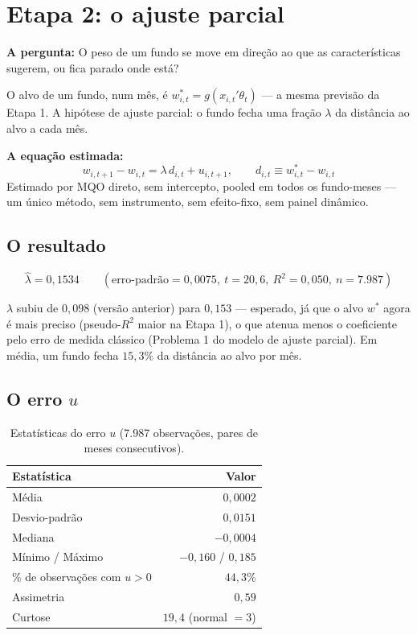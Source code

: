 \documentclass[11pt,a4paper]{article}
\newcommand{\pergunta}[1]{\par\vspace{4pt}\noindent\textbf{\color{azul}A pergunta:} #1\par\vspace{2pt}}
\newcommand{\equacao}[0]{\par\vspace{4pt}\noindent\textbf{\color{vermelho}A equação estimada:}\ }
\begin{document}
\FloatBarrier
\section{Etapa 2: o ajuste parcial}

\pergunta{O peso de um fundo se move em direção ao que as características sugerem, ou fica
parado onde está?}

O alvo de um fundo, num mês, é $w^*_{i,t}=g(x_{i,t}'\theta_t)$ --- a mesma previsão da Etapa 1.
A hipótese de ajuste parcial: o fundo fecha uma fração $\lambda$ da distância ao alvo a cada mês.

\equacao
\begin{equation}
w_{i,t+1} - w_{i,t} = \lambda\, d_{i,t} + u_{i,t+1}, \qquad d_{i,t} \equiv w^*_{i,t} - w_{i,t}
\label{eq:pa}
\end{equation}
Estimado por MQO direto, sem intercepto, pooled em todos os fundo-meses --- um único método,
sem instrumento, sem efeito-fixo, sem painel dinâmico.

\subsection{O resultado}

$$\widehat\lambda = 0{,}1534 \qquad (\text{erro-padrão}=0{,}0075,\ t=20{,}6,\
R^2=0{,}050,\ n=7.987)$$

$\lambda$ subiu de $0{,}098$ (versão anterior) para $0{,}153$ --- esperado, já que o alvo $w^*$
agora é mais preciso (pseudo-$R^2$ maior na Etapa 1), o que atenua menos o coeficiente pelo erro de
medida clássico (Problema 1 do modelo de ajuste parcial). Em média, um fundo fecha $15{,}3\%$
da distância ao alvo por mês.

\subsection{O erro $u$}

\begin{table}[h]\centering\small
\caption{Estatísticas do erro $u$ (7.987 observações, pares de meses consecutivos).}
\begin{tabular}{@{}lr@{}}
\toprule
Estatística & Valor \\
\midrule
Média & $0{,}0002$ \\
Desvio-padrão & $0{,}0151$ \\
Mediana & $-0{,}0004$ \\
Mínimo / Máximo & $-0{,}160$ / $0{,}185$ \\
\% de observações com $u>0$ & $44{,}3\%$ \\
Assimetria & $0{,}59$ \\
Curtose & $19{,}4$ (normal $=3$) \\
\bottomrule
\end{tabular}
\end{table}
\end{document}

